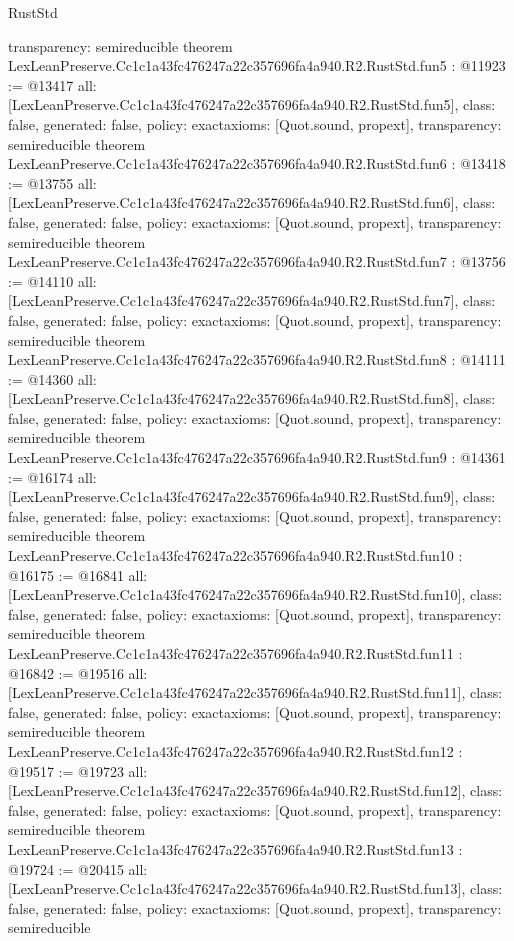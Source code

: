 \begin{lexlean}{RustStd}
\begin{coremodule}
{  transparency: semireducible
}
theorem LexLeanPreserve.Cc1c1a43fc476247a22c357696fa4a940.R2.RustStd.fun5 : @11923 := @13417 {
  all: [LexLeanPreserve.Cc1c1a43fc476247a22c357696fa4a940.R2.RustStd.fun5],
  class: false,
  generated: false,
  policy: exact{axioms: [Quot.sound, propext]},
  transparency: semireducible
}
theorem LexLeanPreserve.Cc1c1a43fc476247a22c357696fa4a940.R2.RustStd.fun6 : @13418 := @13755 {
  all: [LexLeanPreserve.Cc1c1a43fc476247a22c357696fa4a940.R2.RustStd.fun6],
  class: false,
  generated: false,
  policy: exact{axioms: [Quot.sound, propext]},
  transparency: semireducible
}
theorem LexLeanPreserve.Cc1c1a43fc476247a22c357696fa4a940.R2.RustStd.fun7 : @13756 := @14110 {
  all: [LexLeanPreserve.Cc1c1a43fc476247a22c357696fa4a940.R2.RustStd.fun7],
  class: false,
  generated: false,
  policy: exact{axioms: [Quot.sound, propext]},
  transparency: semireducible
}
theorem LexLeanPreserve.Cc1c1a43fc476247a22c357696fa4a940.R2.RustStd.fun8 : @14111 := @14360 {
  all: [LexLeanPreserve.Cc1c1a43fc476247a22c357696fa4a940.R2.RustStd.fun8],
  class: false,
  generated: false,
  policy: exact{axioms: [Quot.sound, propext]},
  transparency: semireducible
}
theorem LexLeanPreserve.Cc1c1a43fc476247a22c357696fa4a940.R2.RustStd.fun9 : @14361 := @16174 {
  all: [LexLeanPreserve.Cc1c1a43fc476247a22c357696fa4a940.R2.RustStd.fun9],
  class: false,
  generated: false,
  policy: exact{axioms: [Quot.sound, propext]},
  transparency: semireducible
}
theorem LexLeanPreserve.Cc1c1a43fc476247a22c357696fa4a940.R2.RustStd.fun10 : @16175 := @16841 {
  all: [LexLeanPreserve.Cc1c1a43fc476247a22c357696fa4a940.R2.RustStd.fun10],
  class: false,
  generated: false,
  policy: exact{axioms: [Quot.sound, propext]},
  transparency: semireducible
}
theorem LexLeanPreserve.Cc1c1a43fc476247a22c357696fa4a940.R2.RustStd.fun11 : @16842 := @19516 {
  all: [LexLeanPreserve.Cc1c1a43fc476247a22c357696fa4a940.R2.RustStd.fun11],
  class: false,
  generated: false,
  policy: exact{axioms: [Quot.sound, propext]},
  transparency: semireducible
}
theorem LexLeanPreserve.Cc1c1a43fc476247a22c357696fa4a940.R2.RustStd.fun12 : @19517 := @19723 {
  all: [LexLeanPreserve.Cc1c1a43fc476247a22c357696fa4a940.R2.RustStd.fun12],
  class: false,
  generated: false,
  policy: exact{axioms: [Quot.sound, propext]},
  transparency: semireducible
}
theorem LexLeanPreserve.Cc1c1a43fc476247a22c357696fa4a940.R2.RustStd.fun13 : @19724 := @20415 {
  all: [LexLeanPreserve.Cc1c1a43fc476247a22c357696fa4a940.R2.RustStd.fun13],
  class: false,
  generated: false,
  policy: exact{axioms: [Quot.sound, propext]},
  transparency: semireducible
}
\end{coremodule}
\end{lexlean}
